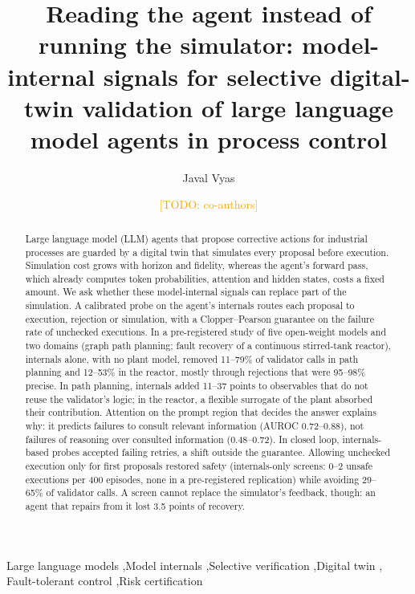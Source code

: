 \documentclass[review,12pt]{elsarticle}
\theoremstyle{remark}
\newcommand{\todo}[1]{\textcolor{orange}{[TODO: #1]}}
\begin{document}
\begin{frontmatter}

\title{Reading the agent instead of running the simulator: model-internal signals for selective
digital-twin validation of large language model agents in process control}

\author[ic]{Javal Vyas}
\author[ic]{\todo{co-authors}}
\address[ic]{\todo{Department}, Imperial College London, London, United Kingdom}

\begin{abstract}
Large language model (LLM) agents that propose corrective actions for industrial processes are guarded by a
digital twin that simulates every proposal before execution. Simulation cost grows with horizon and
fidelity, whereas the agent's forward pass, which already computes token probabilities, attention and hidden
states, costs a fixed amount. We ask whether these model-internal signals can replace part of the simulation. A
calibrated probe on the agent's internals routes each proposal to execution, rejection or simulation, with a
Clopper--Pearson guarantee on the failure rate of unchecked executions. In a pre-registered study of five
open-weight models and two domains (graph path planning; fault recovery of a continuous stirred-tank reactor),
internals alone, with no plant model, removed 11--79\% of validator calls in path planning and 12--53\% in the
reactor, mostly through rejections that were 95--98\% precise. In path planning, internals added 11--37
points to observables that do not reuse the validator's logic; in the reactor, a flexible surrogate of the plant
absorbed their contribution. Attention on the prompt region that decides the answer explains why: it predicts
failures to consult relevant information (AUROC 0.72--0.88), not failures of reasoning over consulted information
(0.48--0.72). In closed loop, internals-based probes accepted failing retries, a shift outside the guarantee.
Allowing unchecked execution only for first proposals restored safety (internals-only screens: 0--2 unsafe
executions per 400 episodes, none in a pre-registered replication) while avoiding 29--65\% of validator calls.
A screen cannot replace the simulator's feedback, though: an agent that repairs from it lost 3.5 points of
recovery.
\end{abstract}

\begin{keyword}
Large language models \sep Model internals \sep Selective verification \sep Digital twin \sep
Fault-tolerant control \sep Risk certification
\end{keyword}

\end{frontmatter}
\end{document}
